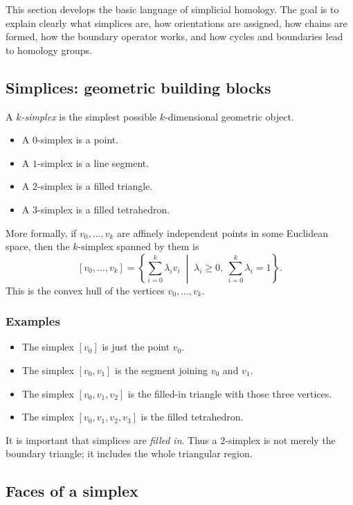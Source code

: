 \documentclass[12pt,a4paper]{article}
\theoremstyle{notespace}
\begin{document}
This section develops the basic language of simplicial homology. The goal is to explain clearly what simplices are, how orientations are assigned, how chains are formed, how the boundary operator works, and how cycles and boundaries lead to homology groups.

\subsection{Simplices: geometric building blocks}

A \emph{\(k\)-simplex} is the simplest possible \(k\)-dimensional geometric object.

\begin{itemize}
	\item A \(0\)-simplex is a point.
	\item A \(1\)-simplex is a line segment.
	\item A \(2\)-simplex is a filled triangle.
	\item A \(3\)-simplex is a filled tetrahedron.
\end{itemize}

More formally, if \(v_0,\dots,v_k\) are affinely independent points in some Euclidean space, then the \(k\)-simplex spanned by them is
\[
[v_0,\dots,v_k]
=
\left\{
\sum_{i=0}^{k}\lambda_i v_i
\;\middle|\;
\lambda_i\ge 0,\ \sum_{i=0}^{k}\lambda_i=1
\right\}.
\]
This is the convex hull of the vertices \(v_0,\dots,v_k\).

\subsubsection*{Examples}

\begin{itemize}
	\item The simplex \([v_0]\) is just the point \(v_0\).
	\item The simplex \([v_0,v_1]\) is the segment joining \(v_0\) and \(v_1\).
	\item The simplex \([v_0,v_1,v_2]\) is the filled-in triangle with those three vertices.
	\item The simplex \([v_0,v_1,v_2,v_3]\) is the filled tetrahedron.
\end{itemize}

It is important that simplices are \emph{filled in}. Thus a \(2\)-simplex is not merely the boundary triangle; it includes the whole triangular region.

\subsection{Faces of a simplex}
\end{document}
